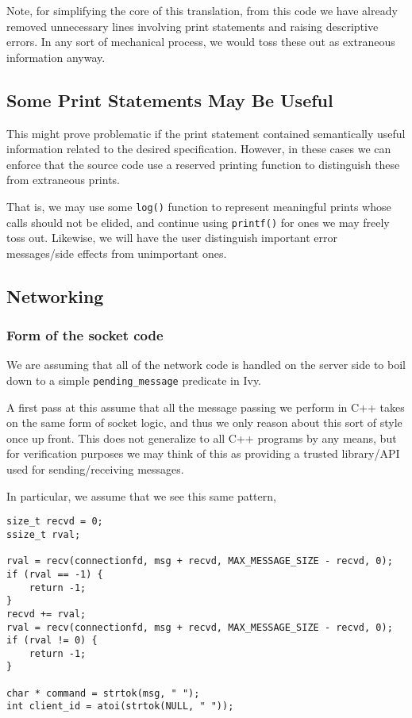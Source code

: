 \documentclass[11pt]{article}
\begin{document}
Note, for simplifying the core of this translation, from this code we have already removed unnecessary lines involving print statements and raising descriptive errors. In any sort of mechanical process, we would toss these out as extraneous information anyway.

\subsection{Some Print Statements May Be Useful}
\label{sec:org224fbed}

This might prove problematic if the print statement contained semantically useful information related to the desired specification. However, in these cases we can enforce that the source code use a reserved printing function to distinguish these from extraneous prints.

That is, we may use some \texttt{log()} function to represent meaningful prints whose calls should not be elided, and continue using \texttt{printf()} for ones we may freely toss out. Likewise, we will have the user distinguish important error messages/side effects from unimportant ones.

\subsection{Networking}
\label{sec:org3e0d7ee}
\subsubsection{Form of the socket code}
\label{sec:org4bb6a85}
We are assuming that all of the network code is handled on the server side to boil down to a simple \texttt{pending\_message} predicate in Ivy.

A first pass at this assume that all the message passing we perform in C++ takes on the same form of socket logic, and thus we only reason about this sort of style once up front. This does not generalize to all C++ programs by any means, but for verification purposes we may think of this as providing a trusted library/API used for sending/receiving messages.

In particular, we assume that we see this same pattern,
\begin{verbatim}
size_t recvd = 0;
ssize_t rval;

rval = recv(connectionfd, msg + recvd, MAX_MESSAGE_SIZE - recvd, 0);
if (rval == -1) {
	return -1;
}
recvd += rval;
rval = recv(connectionfd, msg + recvd, MAX_MESSAGE_SIZE - recvd, 0);
if (rval != 0) {
    return -1;
}

char * command = strtok(msg, " ");
int client_id = atoi(strtok(NULL, " "));
\end{verbatim}
\end{document}
